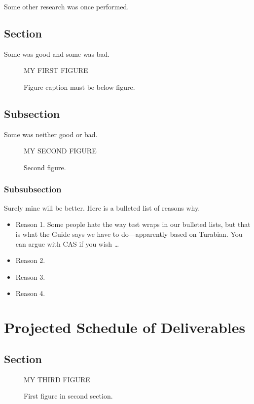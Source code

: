 \documentclass[12pt,econ]{article}
\begin{document}
Some other research was once performed.


\subsection{Section}

Some was good and some was bad.

\begin{figure}
\centering MY FIRST FIGURE
\caption{Figure caption must be below figure.}
\end{figure}


\subsection{Subsection}

Some was neither good or bad.

\begin{figure}
\centering MY SECOND FIGURE
\caption{Second figure.}
\end{figure}


\subsubsection{Subsubsection}

Surely mine will be better.
Here is a bulleted list of reasons why.
\begin{itemize}
\item Reason 1.
Some people hate the way test wraps in our bulleted lists,
but that is what the Guide says we have to do---apparently based on Turabian.
You can argue with CAS if you wish \dots
\item Reason 2.
\item Reason 3.
\item Reason 4.
\end{itemize}


\section{Projected Schedule of Deliverables}


\subsection{Section}


\begin{figure}
\centering MY THIRD FIGURE
\caption{First figure in second section.}
\end{figure}
\end{document}
